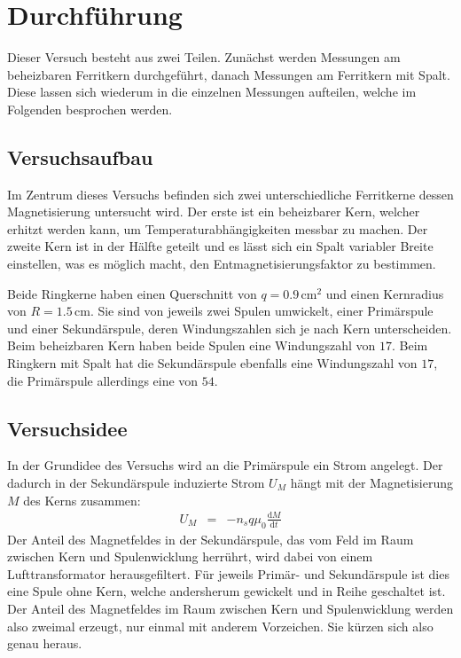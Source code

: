 \documentclass[12pt,a4paper]{scrartcl}
\numberwithin{equation}{section} %
\renewcommand{\[}{} %
\renewcommand{\]}{\noindent} %
\begin{document}
\hypertarget{durchfuxfchrung}{%
\section{Durchführung}\label{durchfuxfchrung}}

Dieser Versuch besteht aus zwei Teilen. Zunächst werden Messungen am
beheizbaren Ferritkern durchgeführt, danach Messungen am Ferritkern mit
Spalt. Diese lassen sich wiederum in die einzelnen Messungen aufteilen,
welche im Folgenden besprochen werden.

\hypertarget{versuchsaufbau}{%
\subsection{Versuchsaufbau}\label{versuchsaufbau}}

Im Zentrum dieses Versuchs befinden sich zwei unterschiedliche
Ferritkerne dessen Magnetisierung untersucht wird. Der erste ist ein
beheizbarer Kern, welcher erhitzt werden kann, um
Temperaturabhängigkeiten messbar zu machen. Der zweite Kern ist in der
Hälfte geteilt und es lässt sich ein Spalt variabler Breite einstellen,
was es möglich macht, den Entmagnetisierungsfaktor zu bestimmen.

Beide Ringkerne haben einen Querschnitt von \(q=0.9\,\mathrm{cm^2}\) und
einen Kernradius von \(R=1.5\,\mathrm{cm}\). Sie sind von jeweils zwei
Spulen umwickelt, einer Primärspule und einer Sekundärspule, deren
Windungszahlen sich je nach Kern unterscheiden. Beim beheizbaren Kern
haben beide Spulen eine Windungszahl von \(17\). Beim Ringkern mit Spalt
hat die Sekundärspule ebenfalls eine Windungszahl von \(17\), die
Primärspule allerdings eine von \(54\).

\hypertarget{versuchsidee}{%
\subsection{Versuchsidee}\label{versuchsidee}}

In der Grundidee des Versuchs wird an die Primärspule ein Strom
angelegt. Der dadurch in der Sekundärspule induzierte Strom \(U_M\)
hängt mit der Magnetisierung \(M\) des Kerns zusammen: \[
\begin{eqnarray}
    U_M &=& -n_s q \mu_0 \frac{\mathrm dM}{\mathrm dt}
\end{eqnarray}
\] Der Anteil des Magnetfeldes in der Sekundärspule, das vom Feld im
Raum zwischen Kern und Spulenwicklung herrührt, wird dabei von einem
Lufttransformator herausgefiltert. Für jeweils Primär- und Sekundärspule
ist dies eine Spule ohne Kern, welche andersherum gewickelt und in Reihe
geschaltet ist. Der Anteil des Magnetfeldes im Raum zwischen Kern und
Spulenwicklung werden also zweimal erzeugt, nur einmal mit anderem
Vorzeichen. Sie kürzen sich also genau heraus.
\end{document}
